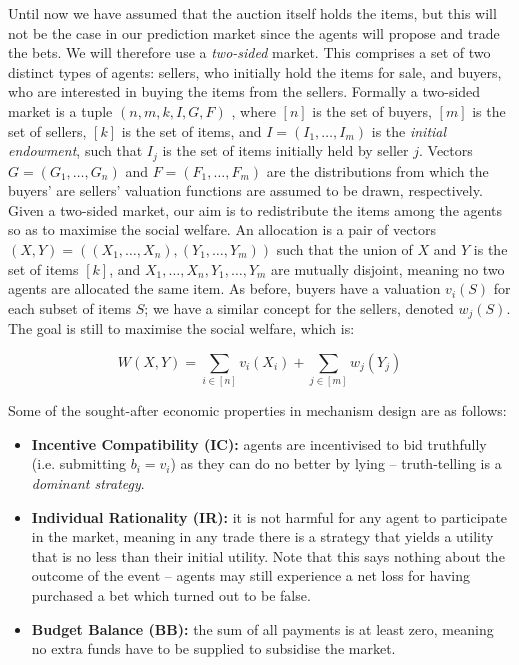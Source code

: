 \documentclass[10pt,a4paper]{article}
\theoremstyle{plain}
\theoremstyle{definition}
\begin{document}
	Until now we have assumed that the auction itself holds the items, but this
	will not be the case in our prediction market since the agents will propose
	and trade the bets. We will therefore use a \emph{two-sided} market. This
	comprises a set of two distinct types of agents: sellers, who initially
	hold the items for sale, and buyers, who are interested in buying the items
	from the sellers. Formally a two-sided market is a tuple $(n, m, k, I, G,
	F)$ \cite{ColiniBaldeschi2017}, where $[n]$ is the set of buyers, $[m]$ is
	the set of sellers, $[k]$ is the set of items, and $I = (I_1, \ldots, I_m)$
	is the \emph{initial endowment}, such that $I_j$ is the set of items
	initially held by seller $j$. Vectors $G = (G_1, \ldots, G_n)$ and $F =
	(F_1, \ldots, F_m)$ are the distributions from which the buyers' are
	sellers' valuation functions are assumed to be drawn, respectively. Given a
	two-sided market, our aim is to redistribute the items among the agents so
	as to maximise the social welfare. An allocation is a pair of vectors
	$(X,Y) = ((X_1, \ldots, X_n), (Y_1, \ldots, Y_m))$ such that the union of
	$X$ and $Y$ is the set of items $[k]$, and $X_1, \ldots, X_n, Y_1, \ldots,
	Y_m$ are mutually disjoint, meaning no two agents are allocated the same
	item. As before, buyers have a valuation $v_i(S)$ for each subset of items
	$S$; we have a similar concept for the sellers,	denoted $w_j(S)$. The goal
	is still to maximise the social welfare, which is:

	\begin{equation*}
		W(X, Y) = \sum_{i \in [n]} v_i(X_i) + \sum_{j \in [m]} w_j(Y_j)
	\end{equation*}

	Some of the sought-after economic properties in mechanism design are as
	follows:

	\begin{itemize}
		\itemsep0em
		\item \textbf{Incentive Compatibility (IC):} agents are incentivised to
			bid truthfully (i.e. submitting $b_i = v_i$) as they can do no
			better by lying -- truth-telling is a \emph{dominant strategy}.

		\item \textbf{Individual Rationality (IR):} it is not harmful for any
			agent to participate in the market, meaning in any trade there is a
			strategy that yields a utility that is no less than their initial
			utility. Note that this says nothing about the outcome of the event
			-- agents may still experience a net loss for having purchased a
			bet which turned out to be false.

		\item \textbf{Budget Balance (BB):} the sum of all payments is at least
			zero, meaning no extra funds have to be supplied to subsidise the
			market.

	\end{itemize}
\end{document}
